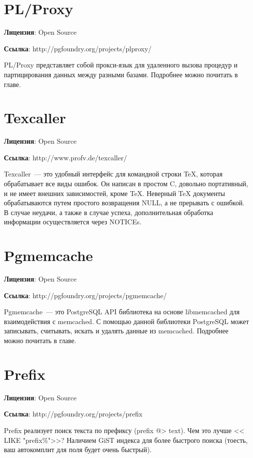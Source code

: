 \section{PL/Proxy}
\textbf{Лицензия}: Open Source

\textbf{Ссылка}: http://pgfoundry.org/projects/plproxy/

PL/Proxy представляет собой прокси-язык для удаленного вызова процедур и партицирования данных между разными базами. 
Подробнее можно почитать в  главе.

\section{Texcaller}
\textbf{Лицензия}: Open Source

\textbf{Ссылка}: http://www.profv.de/texcaller/

Texcaller~--- это удобный интерфейс для командной строки TeX, которая обрабатывает все виды ошибок. Он написан в простом C, довольно портативный, 
и не имеет внешних зависимостей, кроме TeX. Неверный TeX документы обрабатываются путем простого возвращения NULL, 
а не прерывать с ошибкой. В случае неудачи, а также в случае успеха, дополнительная обработка информации осуществляется через NOTICEs.

\section{Pgmemcache}
\textbf{Лицензия}: Open Source

\textbf{Ссылка}: http://pgfoundry.org/projects/pgmemcache/

Pgmemcache~--- это PostgreSQL API библиотека на основе libmemcached для взаимодействия с memcached. С помощью данной библиотеки 
PostgreSQL может записывать, считывать, искать и удалять данные из memcached. Подробнее можно почитать в  главе.

\section{Prefix}
\textbf{Лицензия}: Open Source

\textbf{Ссылка}: http://pgfoundry.org/projects/prefix

Prefix реализует поиск текста по префиксу (prefix @> text). Чем это лучше << LIKE "prefix\%">>?
Наличием GiST индекса для более быстрого поиска (тоесть, ваш автокомплит для поля будет очень быстрый).